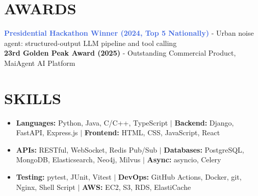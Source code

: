\documentclass[letterpaper,11pt]{article}
\begin{document}
\section{AWARDS}
{\noindent\small

  {\textcolor{RoyalBlue}{\textbf{Presidential Hackathon Winner (2024, Top 5 Nationally)}}} - Urban noise agent: structured-output LLM pipeline and tool calling
  \\ \textbf{23rd Golden Peak Award (2025)} - Outstanding Commercial Product, MaiAgent AI Platform
  
  
}


\section{SKILLS}
\begin{itemize}[leftmargin=0in, label={}]
  












\item\small{\textbf{Languages:} Python, Java, C/C++, TypeScript $|$ \textbf{Backend:} Django, FastAPI, Express.js $|$ \textbf{Frontend:} HTML, CSS, JavaScript, React}
\item\small{\textbf{APIs:} RESTful, WebSocket, Redis Pub/Sub $|$ \textbf{Databases:} PostgreSQL, MongoDB, Elasticsearch, Neo4j, Milvus $|$ \textbf{Async:} asyncio, Celery}
\item\small{\textbf{Testing:} pytest, JUnit, Vitest $|$ \textbf{DevOps:} GitHub Actions, Docker, git, Nginx, Shell Script $|$ \textbf{AWS:} EC2, S3, RDS, ElastiCache}
\end{itemize}
\end{document}

